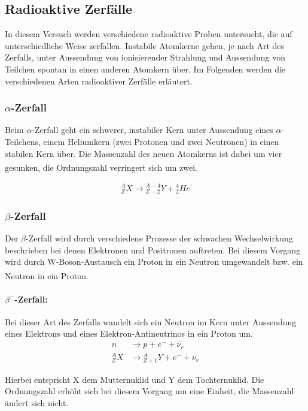 \documentclass[12pt,listof=totoc]{scrartcl}
\begin{document}
\subsection{Radioaktive Zerfälle}
In diesem Versuch werden verschiedene radioaktive Proben untersucht, die auf unterschiedliche Weise zerfallen.
Instabile Atomkerne gehen, je nach Art des Zerfalls, unter Aussendung von ionisierender Strahlung und Aussendung von Teilchen spontan in einen anderen Atomkern über. Im Folgenden werden die verschiedenen Arten radioaktiver Zerfälle erläutert.
\subsubsection{$\alpha$-Zerfall}
Beim $\alpha$-Zerfall geht ein schwerer, instabiler Kern unter Aussendung eines $\alpha$-Teilchens, einem Heliumkern (zwei Protonen und zwei Neutronen) in einen stabilen Kern über. Die Massenzahl des neuen Atomkerns ist dabei um vier gesunken, die Ordnungszahl verringert sich um zwei.\textsuperscript{\cite{Demtröder}}

\begin{align}
{}_Z^A X \rightarrow {}_{Z-2}^{A-4} Y + {}^4_2He
\end{align}

\subsubsection{$\beta$-Zerfall \label{beta}}
Der $\beta$-Zerfall wird durch verschiedene Prozesse der schwachen Wechselwirkung beschrieben bei denen Elektronen  und Positronen auftreten. Bei diesem Vorgang wird durch W-Boson-Austausch ein Proton in ein Neutron umgewandelt bzw. ein Neutron in ein Proton.\textsuperscript{\cite{Demtröder}}

\paragraph*{$\beta^-$-Zerfall:} 
Bei dieser Art des Zerfalls wandelt sich ein Neutron im Kern unter Aussendung eines Elektrons und eines Elektron-Antineutrinos in ein Proton um. 
\begin{align*}
n &\rightarrow p + e^- + \bar{\nu_e}\\
{}_Z^A X &\rightarrow {}_{Z+1}^A Y + e^- + \bar{\nu_e}
\end{align*}

Hierbei entspricht X dem Mutternuklid und Y dem Tochternuklid. Die Ordnungszahl erhöht sich bei diesem Vorgang um eine Einheit, die Massenzahl ändert sich nicht.
\end{document}
